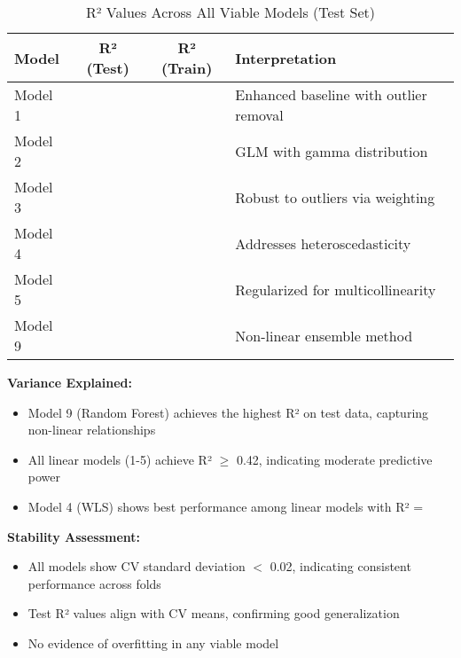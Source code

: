 \begin{table}[h!]
\centering
\caption{R² Values Across All Viable Models (Test Set)}
\label{tab:r2_comparison}
\begin{tabular}{lccl}
\toprule
\textbf{Model} & \textbf{R² (Test)} & \textbf{R² (Train)} & \textbf{Interpretation} \\
\midrule
Model 1 & \ModelOneRSquaredTest{} & \ModelOneRSquaredTrain{} & Enhanced baseline with outlier removal \\
Model 2 & \ModelTwoRSquaredTest{} & \ModelTwoRSquaredTrain{} & GLM with gamma distribution \\
Model 3 & \ModelThreeRSquaredTest{} & \ModelThreeRSquaredTrain{} & Robust to outliers via weighting \\
Model 4 & \ModelFourRSquaredTest{} & \ModelFourRSquaredTrain{} & Addresses heteroscedasticity \\
Model 5 & \ModelFiveRSquaredTest{} & \ModelFiveRSquaredTrain{} & Regularized for multicollinearity \\
Model 9 & \ModelNineRSquaredTest{} & \ModelNineRSquaredTrain{} & Non-linear ensemble method \\
\bottomrule
\end{tabular}
\end{table}

\textbf{Variance Explained:}
\begin{itemize}
    \item Model 9 (Random Forest) achieves the highest R² on test data, capturing non-linear relationships
    \item All linear models (1-5) achieve R² $\geq$ 0.42, indicating moderate predictive power
    \item Model 4 (WLS) shows best performance among linear models with R² = \ModelFourRSquaredTest{}
\end{itemize}


\textbf{Stability Assessment:}
\begin{itemize}
    \item All models show CV standard deviation $<$ 0.02, indicating consistent performance across folds
    \item Test R² values align with CV means, confirming good generalization
    \item No evidence of overfitting in any viable model
\end{itemize}

